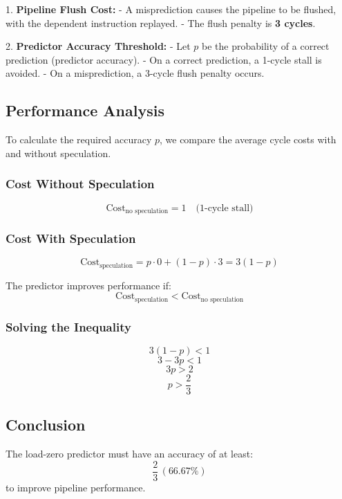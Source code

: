 \documentclass[cn,12pt]{homework}
\begin{document}
\begin{solution}
1. \textbf{Pipeline Flush Cost:}  
   - A misprediction causes the pipeline to be flushed, with the dependent instruction replayed.  
   - The flush penalty is \textbf{3 cycles}.

2. \textbf{Predictor Accuracy Threshold:}  
   - Let \( p \) be the probability of a correct prediction (predictor accuracy).  
   - On a correct prediction, a 1-cycle stall is avoided.  
   - On a misprediction, a 3-cycle flush penalty occurs.

\subsection*{Performance Analysis}
To calculate the required accuracy \( p \), we compare the average cycle costs with and without speculation.

\subsubsection*{Cost Without Speculation}
\[
\text{Cost}_{\text{no speculation}} = 1 \quad \text{(1-cycle stall)}
\]

\subsubsection*{Cost With Speculation}
\[
\text{Cost}_{\text{speculation}} = p \cdot 0 + (1 - p) \cdot 3 = 3(1 - p)
\]

The predictor improves performance if:
\[
\text{Cost}_{\text{speculation}} < \text{Cost}_{\text{no speculation}}
\]

\subsubsection*{Solving the Inequality}
\[
3(1 - p) < 1
\]
\[
3 - 3p < 1
\]
\[
3p > 2
\]
\[
p > \frac{2}{3}
\]

\subsection*{Conclusion}
The load-zero predictor must have an accuracy of at least:
\[
\boxed{\frac{2}{3} \, (66.67\%)}
\]
to improve pipeline performance.
\end{solution}
\end{document}

